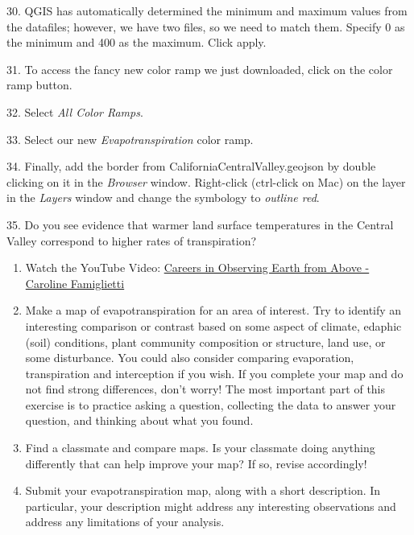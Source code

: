 \documentclass[oneside,a4paper,11pt,explicit]{book}
\begin{document}
30. QGIS has automatically determined the minimum and maximum values from the datafiles; however, we have two files, so we need to match them. Specify 0 as the minimum and 400 as the maximum. Click apply.

31. To access the fancy new color ramp we just downloaded, click on the color ramp button.

32. Select \textit{All Color Ramps}.

33. Select our new \textit{Evapotranspiration} color ramp. 

34. Finally, add the border from CaliforniaCentralValley.geojson by double clicking on it in the \textit{Browser} window. Right-click (ctrl-click on Mac) on the layer in the \textit{Layers} window and change the symbology to \textit{outline red}. 

35. Do you see evidence that warmer land surface temperatures in the Central Valley correspond to higher rates of transpiration?


\begin{tcolorbox}[colback=yellow!5!white,colframe=MACred,title= \vspace{.2em} \Large Make a Map Assignments]
	\large
	\begin{enumerate}
\item Watch the YouTube Video: \href{https://www.youtube.com/watch?v=ax91TmOSNCU}{Careers in Observing Earth from Above - Caroline Famiglietti}

\item Make a map of evapotranspiration for an area of interest. Try to identify an interesting comparison or contrast based on some aspect of climate, edaphic (soil) conditions, plant community composition or structure, land use, or some disturbance. You could also consider comparing evaporation, transpiration and interception if you wish. If you complete your map and do not find strong differences, don’t worry! The most important part of this exercise is to practice asking a question, collecting the data to answer your question, and thinking about what you found.

\item Find a classmate and compare maps. Is your classmate doing anything differently that can help improve your map? If so, revise accordingly!

\item Submit your evapotranspiration map, along with a short description. In particular, your description might address any interesting observations and address any limitations of your analysis.

	\end{enumerate}
\end{tcolorbox}
\end{document}

